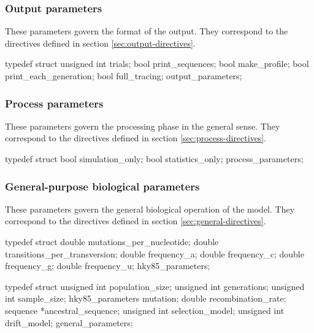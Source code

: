 \documentclass{article}
\begin{document}
      \subsubsection{Output parameters}
	\label{sec:output-parameters}

	These parameters govern the format of the output. They correspond to the
	directives defined in section \ref{sec:output-directives}.

\begin{ccode}
typedef struct {
  unsigned int		trials;
  bool			print_sequences;
  bool			make_profile;
  bool			print_each_generation;
  bool			full_tracing;
} output_parameters;
\end{ccode}

      \subsubsection{Process parameters}
	\label{sec:process-parameters}

	These parameters govern the processing phase in the general sense. They
	correspond to the directives defined in section
	\ref{sec:process-directives}.

\begin{ccode}
typedef struct {
  bool			simulation_only;
  bool			statistics_only;
} process_parameters;
\end{ccode}

      \subsubsection{General-purpose biological parameters}
	\label{sec:general-parameters}

	These parameters govern the general biological operation of the model.
	They correspond to the directives defined in section
	\ref{sec:general-directives}.

\begin{ccode}
typedef struct {
  double		mutations_per_nucleotide;
  double		transitions_per_transversion;
  double		frequency_a;
  double		frequency_c;
  double		frequency_g;
  double		frequency_u;
} hky85_parameters;

typedef struct {
  unsigned int		population_size;
  unsigned int		generations;
  unsigned int		sample_size;
  hky85_parameters	mutation;
  double		recombination_rate;
  sequence		*ancestral_sequence;
  unsigned int		selection_model;
  unsigned int		drift_model;
} general_parameters;
\end{ccode}
\end{document}

